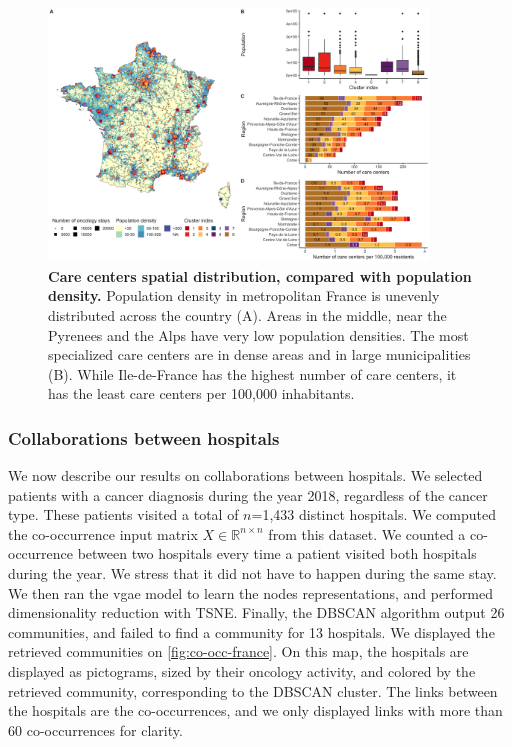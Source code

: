 \begin{figure}[h!]
    \includegraphics[width=0.9\textwidth]{images/camion/supplemental/sup_fig4_care_centers_pop_density.png}
    \centering
    \caption{ \textbf{Care centers spatial distribution, compared with
            population density.} Population density in metropolitan France is
        unevenly distributed across the country (A). Areas in the middle, near
        the Pyrenees and the Alps have very low population densities. The most
        specialized care centers are in dense areas and in large municipalities
        (B). While Ile-de-France has the highest number of care centers, it has
        the least care centers per 100,000 inhabitants. }
    \label{fig:clustering-map}
\end{figure}

\subsubsection{Collaborations between hospitals}

We now describe our results on collaborations between hospitals. We selected
patients with a cancer diagnosis during the year 2018, regardless of the cancer
type. These patients visited a total of $n$=1,433 distinct hospitals. We
computed the co-occurrence input matrix $X \in \mathbb{R}^{n \times n}$ from
this dataset. We counted a co-occurrence between two hospitals every time a
patient visited both hospitals during the year. We stress that it did not have
to happen during the same stay. We then ran the \ac{vgae} model to learn the
nodes representations, and performed dimensionality reduction with TSNE.
Finally, the DBSCAN algorithm output 26 communities, and failed to find a
community for 13 hospitals. We displayed the retrieved communities on
\cref{fig:co-occ-france}. On this map, the hospitals are displayed as
pictograms, sized by their oncology activity, and colored by the retrieved
community, corresponding to the DBSCAN cluster. The links between the hospitals
are the co-occurrences, and we only displayed links with more than 60
co-occurrences for clarity.

